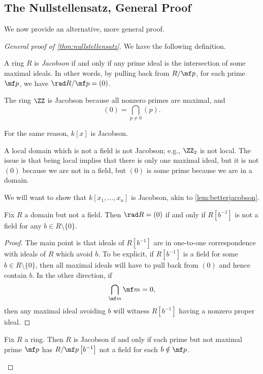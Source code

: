 \subsection{The Nullstellensatz, General Proof}
We now provide an alternative, more general proof.
\begin{proof}[General proof of \autoref{thm:nullstellensatz}]
	We have the following definition.
	\begin{definition}[Jacobson]
		A ring $R$ is \textit{Jacobson} if and only if any prime ideal is the intersection of some maximal ideals. In other words, by pulling back from $R/\mf p$, for each prime $\mf p$, we have $\rad R/\mf p=(0)$.
	\end{definition}
	\begin{example}
		The ring $\ZZ$ is Jacobson because all nonzero primes are maximal, and
		\[(0)=\bigcap_{p\ne0}(p).\]
	\end{example}
	\begin{example}
		For the same reason, $k[x]$ is Jacobson.
	\end{example}
	\begin{nex}
		A local domain which is not a field is not Jacobson; e.g., $\ZZ_2$ is not local. The issue is that being local implies that there is only one maximal ideal, but it is not $(0)$ because we are not in a field, but $(0)$ is some prime because we are in a domain.
	\end{nex}
	We will want to show that $k[x_1,\ldots,x_n]$ is Jacobson, akin to \autoref{lem:betterjacobson}.
	\begin{lemma}
		Fix $R$ a domain but not a field. Then $\rad R=(0)$ if and only if $R\left[b^{-1}\right]$ is not a field for any $b\in R\setminus\{0\}$.
	\end{lemma}
	\begin{proof}
		The main point is that ideals of $R\left[b^{-1}\right]$ are in one-to-one correspondence with ideals of $R$ which avoid $b$. To be explicit, if $R\left[b^{-1}\right]$ is a field for some $b\in R\setminus\{0\}$, then all maximal ideals will have to pull back from $(0)$ and hence contain $b$. In the other direction, if
		\[\bigcap_{\mf m}\mf m=0,\]
		then any maximal ideal avoiding $b$ will witness $R\left[b^{-1}\right]$ having a nonzero proper ideal.
	\end{proof}
	\begin{corollary} \label{cor:betterjacobson}
		Fix $R$ a ring. Then $R$ is Jacobson if and only if each prime but not maximal prime $\mf p$ has $R/\mf p\left[b^{-1}\right]$ not a field for each $b\notin\mf p$.

\end{corollary}
\end{proof}
